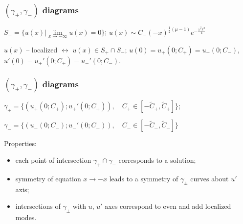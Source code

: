 \documentclass{beamer}
\begin{document}
\begin{frame}
\frametitle{$(\gamma_+, \gamma_-)$ diagrams}

\begin{center}
$S_- = \{u(x) | \lim \limits_{x \to -\infty} u(x) = 0\}$; \quad $u(x) \sim C_- (-x)^{\frac{1}{2}(\mu - 1)} e^{-\frac{\omega^2 x^2}{4}}$
\end{center}

\begin{figure}
\label{pic:asymptotic}
\end{figure}

\begin{center}
$u(x)$ -- localized \quad $\leftrightarrow$ \quad $u(x) \in S_+ \cap S_-$;
$u(0) = u_+(0; C_+) = u_-(0; C_-)$, \quad $u'(0) = u_+'(0; C_+) = u_-'(0; C_-)$.
\end{center}

\end{frame}


\begin{frame}
\frametitle{$(\gamma_+, \gamma_-)$ diagrams}

$\gamma_+ = \{ (u_+(0; C_+); u_+'(0; C_+)), \quad C_+ \in [-\tilde{C}_+, \tilde{C}_+] \}$;

$\gamma_- = \{ (u_-(0; C_-); u_-'(0; C_-)), \quad C_- \in [-\tilde{C}_-, \tilde{C}_-] \}$

\begin{figure}
\label{pic:diagram}
\end{figure}

Properties:
\begin{itemize}
\item each point of intersection $\gamma_+ \cap \gamma_-$ corresponds to a solution;
\item symmetry of equation $x \to -x$ leads to a symmetry of $\gamma_\pm$ curves about $u'$ axis;
\item intersections of $\gamma_\pm$ with $u$, $u'$ axes correspond to even and add localized modes.
\end{itemize}

\end{frame}
\end{document}
